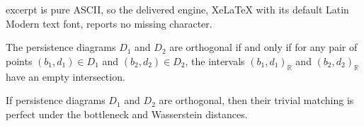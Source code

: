 \documentclass[10pt,a4paper]{amsart}
\begin{document}
excerpt is pure ASCII, so the delivered engine, XeLaTeX with its default Latin Modern text font, reports no missing character.
\begin{proposition}\label{proposition: orthogonal no intersection}
	The persistence diagrams $D_1$ and $D_2$ are orthogonal if and only if for any pair of points $(b_1, d_1) \in D_1$ and $(b_2, d_2) \in D_2$, the intervals $\left(b_1, d_1\right)_{\mathbb{R}}$ and $\left(b_2, d_2\right)_{\mathbb{R}}$ have an empty intersection.
\end{proposition}

\begin{proposition}\label{proposition: orthogonality trivial perfect}
	If persistence diagrams $D_1$ and $D_2$ are orthogonal, then their trivial matching is perfect under the bottleneck and Wasserstein distances.
\end{proposition}
\end{document}
